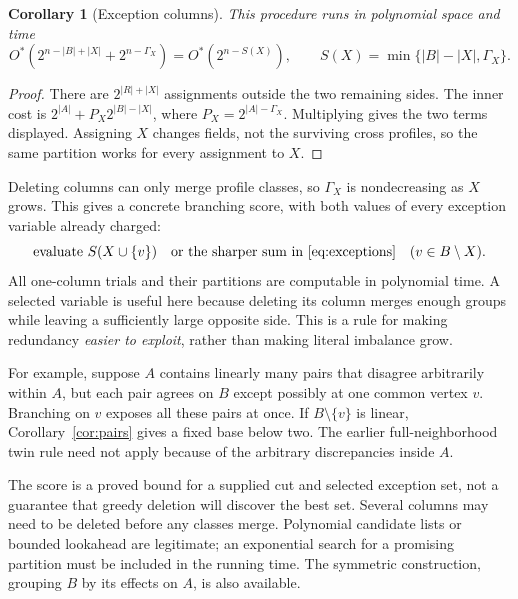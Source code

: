 \documentclass[11pt,a4paper]{article}
\newtheorem{corollary}[theorem]{Corollary}
\theoremstyle{definition}
\newcommand{\Ostar}{O^{*}}
\begin{document}
\begin{corollary}[Exception columns]\label{cor:exceptions}
This procedure runs in polynomial space and time
\begin{equation}
 \Ostar\!\left(2^{n-|B|+|X|}+2^{n-\Gamma_X}\right)
 =\Ostar\!\left(2^{n-S(X)}\right),\qquad
 S(X)=\min\{|B|-|X|,\Gamma_X\}.
 \label{eq:exceptions}
\end{equation}
\end{corollary}
\begin{proof}
There are $2^{|R|+|X|}$ assignments outside the two remaining sides.
The inner cost is
$2^{|A|}+P_X2^{|B|-|X|}$, where
$P_X=2^{|A|-\Gamma_X}$. Multiplying gives the two terms displayed.
Assigning $X$ changes fields, not the surviving cross profiles, so the
same partition works for every assignment to $X$.
\end{proof}

Deleting columns can only merge profile classes, so $\Gamma_X$ is
nondecreasing as $X$ grows. This gives a concrete branching score, with
both values of every exception variable already charged:
\begin{equation}
 \text{evaluate } S(X\cup\{v\})
 \quad\text{or the sharper sum in~\eqref{eq:exceptions}}
 \quad(v\in B\setminus X). \label{eq:selection}
\end{equation}
All one-column trials and their partitions are computable in polynomial
time. A selected variable is useful here because deleting its column
merges enough groups while leaving a sufficiently large opposite side.
This is a rule for making redundancy \emph{easier to exploit}, rather
than making literal imbalance grow.

For example, suppose $A$ contains linearly many pairs that disagree
arbitrarily within $A$, but each pair agrees on $B$ except possibly at
one common vertex $v$. Branching on $v$ exposes all these pairs at once.
If $B\setminus\{v\}$ is linear, Corollary~\ref{cor:pairs} gives a fixed
base below two. The earlier full-neighborhood twin rule need not apply
because of the arbitrary discrepancies inside $A$.

The score is a proved bound for a supplied cut and selected exception
set, not a guarantee that greedy deletion will discover the best set.
Several columns may need to be deleted before any classes merge.
Polynomial candidate lists or bounded lookahead are legitimate; an
exponential search for a promising partition must be included in the
running time. The symmetric construction, grouping $B$ by its effects
on $A$, is also available.
\end{document}
